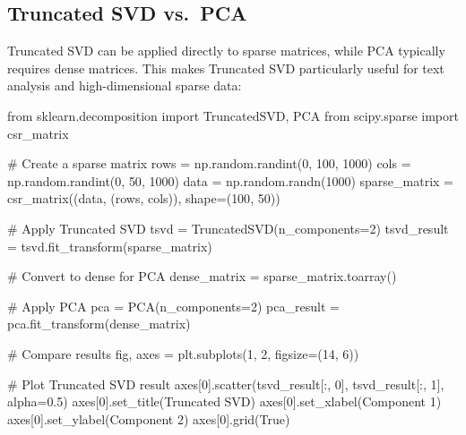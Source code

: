 \documentclass[
  letterpaper,
  DIV=11,
  numbers=noendperiod]{scrreprt}
\newenvironment{Shaded}{\begin{snugshade}}{\end{snugshade}}
\newcommand{\CommentTok}[1]{\textcolor[rgb]{0.37,0.37,0.37}{#1}}
\newcommand{\DecValTok}[1]{\textcolor[rgb]{0.68,0.00,0.00}{#1}}
\newcommand{\FloatTok}[1]{\textcolor[rgb]{0.68,0.00,0.00}{#1}}
\newcommand{\ImportTok}[1]{\textcolor[rgb]{0.00,0.46,0.62}{#1}}
\newcommand{\NormalTok}[1]{\textcolor[rgb]{0.00,0.23,0.31}{#1}}
\newcommand{\OperatorTok}[1]{\textcolor[rgb]{0.37,0.37,0.37}{#1}}
\newcommand{\StringTok}[1]{\textcolor[rgb]{0.13,0.47,0.30}{#1}}
\newcommand{\VariableTok}[1]{\textcolor[rgb]{0.07,0.07,0.07}{#1}}
\begin{document}
\subsection{Truncated SVD vs.~PCA}\label{truncated-svd-vs.-pca}

Truncated SVD can be applied directly to sparse matrices, while PCA
typically requires dense matrices. This makes Truncated SVD particularly
useful for text analysis and high-dimensional sparse data:

\begin{Shaded}
\begin{Highlighting}[]
\ImportTok{from}\NormalTok{ sklearn.decomposition }\ImportTok{import}\NormalTok{ TruncatedSVD, PCA}
\ImportTok{from}\NormalTok{ scipy.sparse }\ImportTok{import}\NormalTok{ csr\_matrix}

\CommentTok{\# Create a sparse matrix}
\NormalTok{rows }\OperatorTok{=}\NormalTok{ np.random.randint(}\DecValTok{0}\NormalTok{, }\DecValTok{100}\NormalTok{, }\DecValTok{1000}\NormalTok{)}
\NormalTok{cols }\OperatorTok{=}\NormalTok{ np.random.randint(}\DecValTok{0}\NormalTok{, }\DecValTok{50}\NormalTok{, }\DecValTok{1000}\NormalTok{)}
\NormalTok{data }\OperatorTok{=}\NormalTok{ np.random.randn(}\DecValTok{1000}\NormalTok{)}
\NormalTok{sparse\_matrix }\OperatorTok{=}\NormalTok{ csr\_matrix((data, (rows, cols)), shape}\OperatorTok{=}\NormalTok{(}\DecValTok{100}\NormalTok{, }\DecValTok{50}\NormalTok{))}

\CommentTok{\# Apply Truncated SVD}
\NormalTok{tsvd }\OperatorTok{=}\NormalTok{ TruncatedSVD(n\_components}\OperatorTok{=}\DecValTok{2}\NormalTok{)}
\NormalTok{tsvd\_result }\OperatorTok{=}\NormalTok{ tsvd.fit\_transform(sparse\_matrix)}

\CommentTok{\# Convert to dense for PCA}
\NormalTok{dense\_matrix }\OperatorTok{=}\NormalTok{ sparse\_matrix.toarray()}

\CommentTok{\# Apply PCA}
\NormalTok{pca }\OperatorTok{=}\NormalTok{ PCA(n\_components}\OperatorTok{=}\DecValTok{2}\NormalTok{)}
\NormalTok{pca\_result }\OperatorTok{=}\NormalTok{ pca.fit\_transform(dense\_matrix)}

\CommentTok{\# Compare results}
\NormalTok{fig, axes }\OperatorTok{=}\NormalTok{ plt.subplots(}\DecValTok{1}\NormalTok{, }\DecValTok{2}\NormalTok{, figsize}\OperatorTok{=}\NormalTok{(}\DecValTok{14}\NormalTok{, }\DecValTok{6}\NormalTok{))}

\CommentTok{\# Plot Truncated SVD result}
\NormalTok{axes[}\DecValTok{0}\NormalTok{].scatter(tsvd\_result[:, }\DecValTok{0}\NormalTok{], tsvd\_result[:, }\DecValTok{1}\NormalTok{], alpha}\OperatorTok{=}\FloatTok{0.5}\NormalTok{)}
\NormalTok{axes[}\DecValTok{0}\NormalTok{].set\_title(}\StringTok{\textquotesingle{}Truncated SVD\textquotesingle{}}\NormalTok{)}
\NormalTok{axes[}\DecValTok{0}\NormalTok{].set\_xlabel(}\StringTok{\textquotesingle{}Component 1\textquotesingle{}}\NormalTok{)}
\NormalTok{axes[}\DecValTok{0}\NormalTok{].set\_ylabel(}\StringTok{\textquotesingle{}Component 2\textquotesingle{}}\NormalTok{)}
\NormalTok{axes[}\DecValTok{0}\NormalTok{].grid(}\VariableTok{True}\NormalTok{)}


\end{Highlighting}
\end{Shaded}
\end{document}
